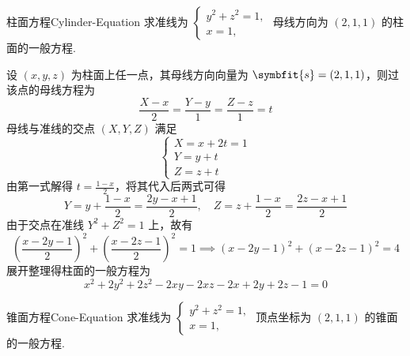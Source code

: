 \begin{problem}{柱面方程}{Cylinder-Equation}
    求准线为 $\begin{cases} y^2 + z^2 = 1, \\ x = 1, \end{cases}$ 母线方向为 $(2, 1, 1)$ 的柱面的一般方程.
\end{problem}

\begin{solution}
    设 $(x, y, z)$ 为柱面上任一点，其母线方向向量为 $\symbfit{s} = (2, 1, 1)$，则过该点的母线方程为
    \begin{equation}
        \frac{X - x}{2} = \frac{Y - y}{1} = \frac{Z - z}{1} = t
    \end{equation}
    母线与准线的交点 $(X, Y, Z)$ 满足
    \begin{equation}
        \begin{cases}
            X = x + 2t = 1 \\
            Y = y + t      \\
            Z = z + t
        \end{cases}
    \end{equation}
    由第一式解得 $t = \frac{1 - x}{2}$，将其代入后两式可得
    \begin{equation}
        Y = y + \frac{1 - x}{2} = \frac{2y - x + 1}{2}, \quad Z = z + \frac{1 - x}{2} = \frac{2z - x + 1}{2}
    \end{equation}
    由于交点在准线 $Y^2 + Z^2 = 1$ 上，故有
    \begin{equation}
        \left(\frac{x - 2y - 1}{2}\right)^2 + \left(\frac{x - 2z - 1}{2}\right)^2 = 1 \implies (x - 2y - 1)^2 + (x - 2z - 1)^2 = 4
    \end{equation}
    展开整理得柱面的一般方程为
    \begin{equation}
        \boxed{x^2 + 2y^2 + 2z^2 - 2xy - 2xz - 2x + 2y + 2z - 1 = 0}
    \end{equation}
\end{solution}


\begin{problem}{锥面方程}{Cone-Equation}
    求准线为 $\begin{cases} y^2 + z^2 = 1, \\ x = 1, \end{cases}$ 顶点坐标为 $(2, 1, 1)$ 的锥面的一般方程.
\end{problem}

